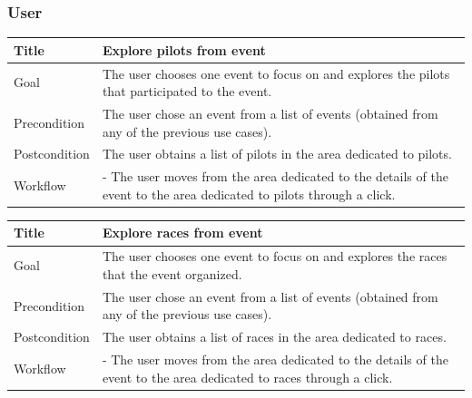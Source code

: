 \documentclass{beamer}
\begin{document}


\begin{frame}
    \frametitle{User}
    \begin{table}
        \tiny
        \begin{tabular}{|p{2cm}|p{6cm}|}
        \hline  
        Title & \textbf{Explore pilots from event} \\
        \hline
        Goal & The user chooses one event to focus on and explores the pilots that participated to the event. \\
        \hline
        Precondition & The user chose an event from a list of events (obtained from any of the previous use cases).\\
        \hline
        Postcondition & The user obtains a list of pilots in the area dedicated to pilots. \\
        \hline
        Workflow &
        - The user moves from the area dedicated to the details of the event to the
        area dedicated to pilots through a click. \\
        \hline
        \end{tabular}
\end{table}

\begin{table}
    \tiny
    \begin{tabular}{|p{2cm}|p{6cm}|}
    \hline  
    Title & \textbf{Explore races from event} \\
    \hline
    Goal & The user chooses one event to focus on and
    explores the races that the event organized. \\
    \hline
    Precondition & The user chose an event from a list of events (obtained from any of the previous use cases).\\
    \hline
    Postcondition & The user obtains
    a list of races in the area dedicated to races. \\
    \hline
    Workflow &
    - The user moves from the area dedicated to the details of the event to the
    area dedicated to races through a click. \\
    \hline
    \end{tabular}
\end{table}
\end{frame}

\end{document}
